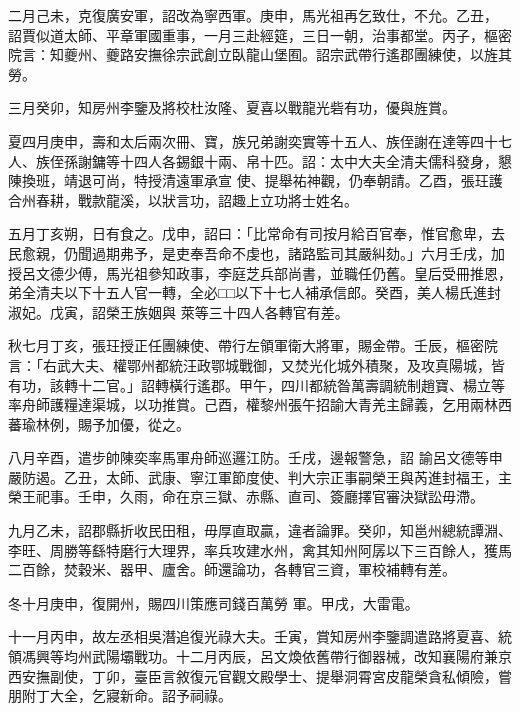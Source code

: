 \begin{pinyinscope}
 二月己未，克復廣安軍，詔改為寧西軍。庚申，馬光祖再乞致仕，不允。乙丑，
 詔賈似道太師、平章軍國重事，一月三赴經筵，三日一朝，治事都堂。丙子，樞密院言：知夔州、夔路安撫徐宗武創立臥龍山堡囿。詔宗武帶行遙郡團練使，以旌其勞。



 三月癸卯，知房州李鑒及將校杜汝隆、夏喜以戰龍光砦有功，優與旌賞。



 夏四月庚申，壽和太后兩次冊、寶，族兄弟謝奕實等十五人、族侄謝在達等四十七人、族侄孫謝鏞等十四人各錫銀十兩、帛十匹。詔：太中大夫全清夫儒科發身，懇陳換班，靖退可尚，特授清遠軍承宣
 使、提舉祐神觀，仍奉朝請。乙酉，張玨護合州春耕，戰款龍溪，以狀言功，詔趣上立功將士姓名。



 五月丁亥朔，日有食之。戊申，詔曰：「比常命有司按月給百官奉，惟官愈卑，去民愈親，仍聞過期弗予，是吏奉吾命不虔也，諸路監司其嚴糾劾。」六月壬戌，加授呂文德少傅，馬光祖參知政事，李庭芝兵部尚書，並職任仍舊。皇后受冊推恩，弟全清夫以下十五人官一轉，全必□□以下十七人補承信郎。癸酉，美人楊氏進封淑妃。戊寅，詔榮王族姻與
 萊等三十四人各轉官有差。



 秋七月丁亥，張玨授正任團練使、帶行左領軍衛大將軍，賜金帶。壬辰，樞密院言：「右武大夫、權鄂州都統汪政鄂城戰御，又焚光化城外積聚，及攻真陽城，皆有功，該轉十二官。」詔轉橫行遙郡。甲午，四川都統昝萬壽調統制趙寶、楊立等率舟師護糧達渠城，以功推賞。己酉，權黎州張午招諭大青羌主歸義，乞用兩林西蕃瑜林例，賜予加優，從之。



 八月辛酉，遣步帥陳奕率馬軍舟師巡邏江防。壬戌，邊報警急，詔
 諭呂文德等申嚴防遏。乙丑，太師、武康、寧江軍節度使、判大宗正事嗣榮王與芮進封福王，主榮王祀事。壬申，久雨，命在京三獄、赤縣、直司、簽廳擇官審決獄訟毋滯。



 九月乙未，詔郡縣折收民田租，毋厚直取贏，違者論罪。癸卯，知邕州總統譚淵、李旺、周勝等繇特磨行大理界，率兵攻建水州，禽其知州阿孱以下三百餘人，獲馬二百餘，焚穀米、器甲、廬舍。師還論功，各轉官三資，軍校補轉有差。



 冬十月庚申，復開州，賜四川策應司錢百萬勞
 軍。甲戌，大雷電。



 十一月丙申，故左丞相吳潛追復光祿大夫。壬寅，賞知房州李鑒調遣路將夏喜、統領馮興等均州武陽壩戰功。十二月丙辰，呂文煥依舊帶行御器械，改知襄陽府兼京西安撫副使，丁卯，臺臣言敘復元官觀文殿學士、提舉洞霄宮皮龍榮貪私傾險，嘗朋附丁大全，乞寢新命。詔予祠祿。




\end{pinyinscope}
